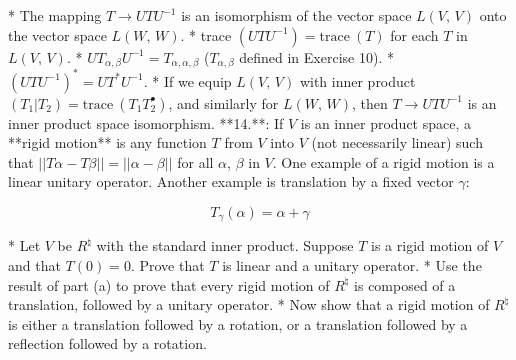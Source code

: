 * The mapping \(T\to UTU^{-1}\) is an isomorphism of the vector space \(L(V,\,V)\) onto the vector space \(L(W,\,W)\).
* trace \((UTU^{-1})=\text{trace}\ (T)\) for each \(T\) in \(L(V,\,V)\).
* \(UT_{\alpha,\beta}U^{-1}=T_{\alpha,\alpha,\beta}\) (\(T_{\alpha,\beta}\) defined in Exercise 10).
* \((UTU^{-1})^{*}=UT^{*}U^{-1}\).
* If we equip \(L(V,\,V)\) with inner product \((T_{1}|T_{2})=\text{trace}\ (T_{1}T_{2}^{\bullet})\), and similarly for \(L(W,\,W)\), then \(T\to UTU^{-1}\) is an inner product space isomorphism.
**14.**: If \(V\) is an inner product space, a **rigid motion** is any function \(T\) from \(V\) into \(V\) (not necessarily linear) such that \(||T\alpha-T\beta||=||\alpha-\beta||\) for all \(\alpha\), \(\beta\) in \(V\). One example of a rigid motion is a linear unitary operator. Another example is translation by a fixed vector \(\gamma\):

\[T_{\gamma}(\alpha)=\alpha+\gamma\]

* Let \(V\) be \(R^{\natural}\) with the standard inner product. Suppose \(T\) is a rigid motion of \(V\) and that \(T(0)=0\). Prove that \(T\) is linear and a unitary operator.
* Use the result of part (a) to prove that every rigid motion of \(R^{\natural}\) is composed of a translation, followed by a unitary operator.
* Now show that a rigid motion of \(R^{\natural}\) is either a translation followed by a rotation, or a translation followed by a reflection followed by a rotation.

